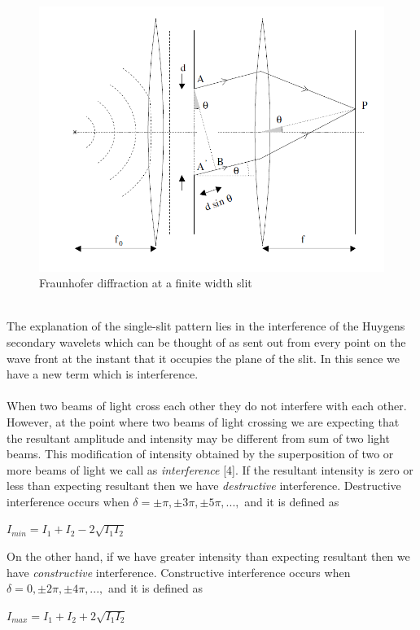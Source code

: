 \documentclass[a4paper,12pt]{report}
\begin{document}
\begin{figure}[h!]
\centering
\includegraphics[width=0.9\linewidth, height=0.5\textheight]{fraunhofer}
\caption{Fraunhofer diffraction at a finite width slit}
\label{fig:fraunhofer}
\end{figure}
\\
The explanation of the single-slit pattern lies in the interference of the Huygens
secondary wavelets which can be thought of as sent out from every point on the wave front at the instant that it occupies the plane of the slit. In this sence we have a new term which is interference.\\\\
When two beams of light cross each other they do not interfere with each other. However, at the point where two beams of light crossing we are expecting that the resultant amplitude and intensity may be different from sum of two light beams. This modification of intensity obtained
by the superposition of two or more beams of light we call as \textit{interference} [4]. If the resultant intensity is zero or less than expecting resultant then we have \textit{destructive} interference.  Destructive interference occurs when $\delta=\pm\pi,\pm 3\pi, \pm 5\pi, ...,$ and it is defined as 
\begin{center}
	$I_{min}=I_{1}+I_{2}-2\sqrt{I_{1}I_{2}}$
\end{center}
On the other hand, if we have greater intensity than expecting resultant then we have \textit{constructive} interference. Constructive interference occurs when $\delta=0,\pm 2\pi, \pm 4\pi, ...,$ and it is defined as
\begin{center}
	$I_{max}=I_{1}+I_{2}+2\sqrt{I_{1}I_{2}}$
\end{center}
\end{document}
